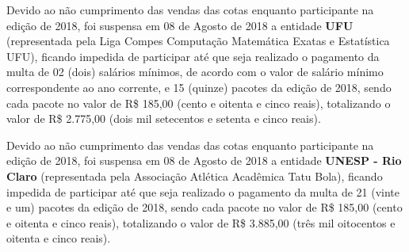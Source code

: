 \begin{article}
	\begin{xparagraph}
    	Devido ao não cumprimento das vendas das cotas enquanto participante na edição de 2018, foi suspensa em 08 de Agosto de 2018 a entidade \textbf{UFU} (representada pela Liga Compes Computação Matemática Exatas e Estatística UFU), ficando impedida de participar até que seja realizado o pagamento da multa de 02 (dois) salários mínimos, de acordo com o valor de salário mínimo correspondente ao ano corrente, e 15 (quinze) pacotes da edição de 2018, sendo cada pacote no valor de R\$ 185,00 (cento e oitenta e cinco reais), totalizando o valor de R\$ 2.775,00 (dois mil setecentos e setenta e cinco reais).
    \end{xparagraph}
    
	\begin{xparagraph}
    	Devido ao não cumprimento das vendas das cotas enquanto participante na edição de 2018, foi suspensa em 08 de Agosto de 2018 a entidade \textbf{UNESP - Rio Claro} (representada pela Associação Atlética Acadêmica Tatu Bola), ficando impedida de participar até que seja realizado o pagamento da multa de 21 (vinte e um) pacotes da edição de 2018, sendo cada pacote no valor de R\$ 185,00 (cento e oitenta e cinco reais), totalizando o valor de R\$ 3.885,00 (três mil oitocentos e oitenta e cinco reais).
    \end{xparagraph}
\end{article}